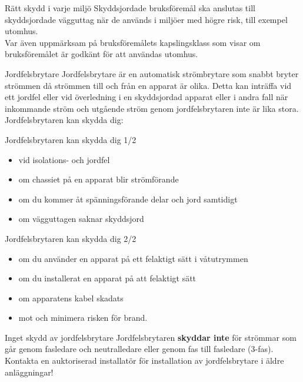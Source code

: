 \documentclass{beamer}
\begin{document}
\begin{frame}{Rätt skydd i varje miljö}
Skyddsjordade bruksföremål ska anslutas till skyddsjordade vägguttag när de
används i miljöer med högre risk, till exempel utomhus.\\
\vspace{5mm}
Var även uppmärksam på bruksföremålets kapslingsklass som visar om bruksföremålet är
godkänt för att användas utomhus.
\end{frame}

\begin{frame}{Jordfelsbrytare}
Jordfelsbrytare är en automatisk strömbrytare som snabbt bryter strömmen
då strömmen till och från en apparat är olika.
Detta kan inträffa vid ett jordfel eller vid överledning i en skyddsjordad
apparat eller i andra fall när inkommande ström och utgående ström genom
jordfelsbrytaren inte är lika stora.\\
\vspace{5mm}
Jordfelsbrytaren kan skydda dig:
\end{frame}

\begin{frame}{Jordfelsbrytaren kan skydda dig 1/2}
\begin{itemize}
	\item vid isolations- och jordfel
	\item om chassiet på en apparat blir strömförande
	\item om du kommer åt spänningsförande delar och jord samtidigt
	\item om vägguttagen saknar skyddsjord
\end{itemize}
\end{frame}

\begin{frame}{Jordfelsbrytaren kan skydda dig 2/2}
\begin{itemize}
	\item om du använder en apparat på ett felaktigt sätt i våtutrymmen
	\item om du installerat en apparat på att felaktigt sätt
	\item om apparatens kabel skadats
	\item mot och minimera risken för brand.
\end{itemize}
\end{frame}

\begin{frame}{Inget skydd av jordfelsbrytare}
Jordfelsbrytaren \textbf{skyddar inte} för strömmar som går genom fasledare
och neutralledare eller genom fas till fasledare (3-fas).\\
\vspace{5mm}
Kontakta en auktoriserad installatör för installation av jordfelsbrytare i äldre
anläggningar!
\end{frame}
\end{document}
